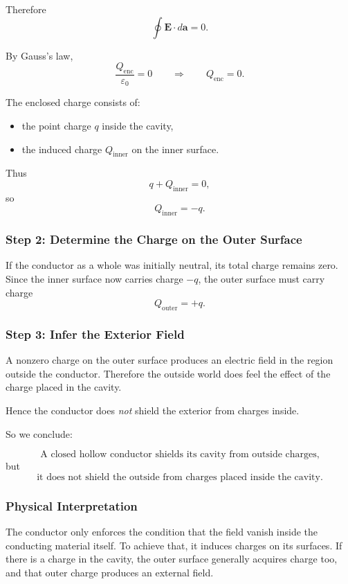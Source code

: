 \documentclass[hidelinks]{article}
\begin{document}
Therefore
\[
\oint \mathbf{E}\cdot d\mathbf{a}=0.
\]

By Gauss's law,
\[
\frac{Q_{\mathrm{enc}}}{\varepsilon_0}=0
\qquad \Rightarrow \qquad
Q_{\mathrm{enc}}=0.
\]

The enclosed charge consists of:
\begin{itemize}
    \item the point charge $q$ inside the cavity,
    \item the induced charge $Q_{\mathrm{inner}}$ on the inner surface.
\end{itemize}

Thus
\[
q+Q_{\mathrm{inner}}=0,
\]
so
\[
\boxed{Q_{\mathrm{inner}}=-q.}
\]

\subsubsection{Step 2: Determine the Charge on the Outer Surface}

If the conductor as a whole was initially neutral, its total charge remains zero. Since the inner surface now carries charge $-q$, the outer surface must carry charge
\[
\boxed{Q_{\mathrm{outer}}=+q.}
\]

\subsubsection{Step 3: Infer the Exterior Field}

A nonzero charge on the outer surface produces an electric field in the region outside the conductor. Therefore the outside world does feel the effect of the charge placed in the cavity.

Hence the conductor does \emph{not} shield the exterior from charges inside.

So we conclude:

\[
\boxed{\text{A closed hollow conductor shields its cavity from outside charges,}}
\]
but
\[
\boxed{\text{it does not shield the outside from charges placed inside the cavity.}}
\]

\subsubsection{Physical Interpretation}

The conductor only enforces the condition that the field vanish inside the conducting material itself. To achieve that, it induces charges on its surfaces. If there is a charge in the cavity, the outer surface generally acquires charge too, and that outer charge produces an external field.
\end{document}
